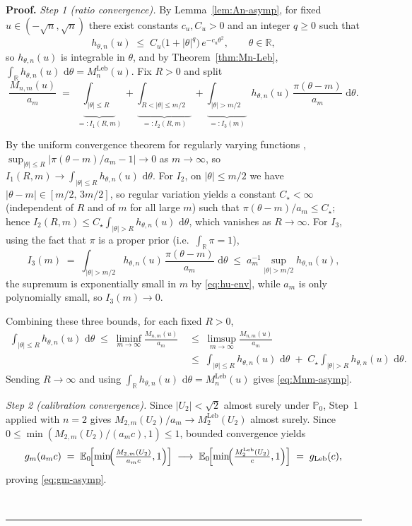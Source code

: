 \documentclass{article}%
\newenvironment{proof}[1][Proof]{\noindent\textbf{#1.} }{\ \rule{0.5em}{0.5em}}
\newcommand{\E}{\mathbb{E}}
\newcommand{\Prob}{\mathbb{P}}
\newcommand{\dd}{\,\mathrm{d}}
\newcommand{\Leb}{\mathrm{Leb}}
\newcommand{\1}{\mathbf{1}}
\begin{document}
\begin{proof}
\emph{Step 1 (ratio convergence).} By Lemma~\ref{lem:An-asymp}, for fixed
$u\in(-\sqrt n,\sqrt n)$ there exist constants $c_u, C_u > 0$ and an integer
$q\geq 0$ such that
\begin{equation}\label{eq:hu-env}
  h_{\theta,n}(u)\;\leq\; C_u\bigl(1+|\theta|^q\bigr)\,e^{-c_u\theta^2},
  \qquad \theta\in\mathbb{R},
\end{equation}
so $h_{\theta,n}(u)$ is integrable in $\theta$, and by Theorem~\ref{thm:Mn-Leb},
$\int_\mathbb{R} h_{\theta,n}(u)\,\dd\theta = M_n^{\Leb}(u)$. Fix $R>0$ and split
\[
  \frac{M_{n,m}(u)}{a_m}
  \;=\;\underbrace{\int_{|\theta|\leq R}}_{=:I_1(R,m)}
   +\underbrace{\int_{R<|\theta|\leq m/2}}_{=:I_2(R,m)}
   +\underbrace{\int_{|\theta|>m/2}}_{=:I_3(m)}\;
   h_{\theta,n}(u)\,\frac{\pi(\theta-m)}{a_m}\,\dd\theta.
\]

By the uniform convergence theorem for regularly varying functions
\citep[Theorem~1.2.1]{Bingham1987}, $\sup_{|\theta|\leq R}|\pi(\theta-m)/a_m-1|\to 0$
as $m\to\infty$, so $I_1(R,m)\to\int_{|\theta|\leq R}h_{\theta,n}(u)\,\dd\theta$.
For $I_2$, on $|\theta|\leq m/2$ we have $|\theta-m|\in[m/2,\,3m/2]$, so
regular variation yields a constant $C_\star<\infty$ (independent of $R$ and of
$m$ for all large $m$) such that $\pi(\theta-m)/a_m\leq C_\star$; hence
$I_2(R,m)\leq C_\star\int_{|\theta|>R}h_{\theta,n}(u)\,\dd\theta$, which vanishes
as $R\to\infty$. For $I_3$, using the fact that $\pi$ is a proper prior
(i.e.\ $\int_\mathbb{R}\pi=1$),
\[
I_3(m)\;=\;\int_{|\theta|>m/2}h_{\theta,n}(u)\,\frac{\pi(\theta-m)}{a_m}\,\dd\theta
   \;\leq\; a_m^{-1}\sup_{|\theta|>m/2}h_{\theta,n}(u),
\]
the supremum is exponentially small in $m$ by \eqref{eq:hu-env}, while $a_m$ is
only polynomially small, so $I_3(m)\to 0$.

Combining these three bounds, for each fixed $R>0$,
\begin{align*}
   \int_{|\theta|\leq R}h_{\theta,n}(u)\,\dd\theta
   \;\leq\; \liminf_{m\to\infty}\frac{M_{n,m}(u)}{a_m}
   &\;\leq\; \limsup_{m\to\infty}\frac{M_{n,m}(u)}{a_m}\\
   & \;\leq\; \int_{|\theta|\leq R}h_{\theta,n}(u)\,\dd\theta
   \;+\; C_\star\!\int_{|\theta|>R}h_{\theta,n}(u)\,\dd\theta.
\end{align*}
Sending $R\to\infty$ and using $\int_\mathbb{R} h_{\theta,n}(u)\,\dd\theta
= M_n^{\Leb}(u)$ gives \eqref{eq:Mnm-asymp}.

\emph{Step 2 (calibration convergence).}
Since \(|U_2|<\sqrt 2\) almost surely under \(\Prob_0\), Step~1 applied with \(n=2\) gives
\(M_{2,m}(U_2)/a_m\to M_2^{\Leb}(U_2)\) almost surely. Since \(0\leq\min(M_{2,m}(U_2)/(a_m c),1)\leq 1\), bounded convergence yields
\[
  g_m(a_m c)
  \;=\;\E_0\!\Bigl[\min\!\Bigl(\tfrac{M_{2,m}(U_2)}{a_mc},1\Bigr)\Bigr]
  \;\longrightarrow\;
  \E_0\!\Bigl[\min\!\Bigl(\tfrac{M_2^{\Leb}(U_2)}{c},1\Bigr)\Bigr]
  \;=\;g_{\Leb}(c),
\]
proving \eqref{eq:gm-asymp}.


\end{proof}
\end{document}

